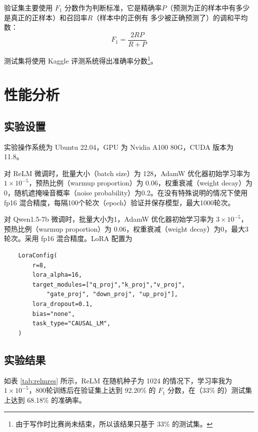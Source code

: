 \documentclass{sjtuarticle}
\begin{document}
验证集主要使用 $F_1$ 分数作为判断标准，它是精确率$P$（预测为正的样本中有多少是真正的正样本）和召回率$R$（样本中的正例有
多少被正确预测了）的调和平均数：
\begin{equation}
    F_1=\frac{2RP}{R+P}
\end{equation}

测试集将使用 Kaggle 评测系统\cite{kaggle}得出准确率分数\footnote{由于写作时比赛尚未结束，所以该结果只基于 33\% 的测试集。}。

\section{性能分析}

\subsection{实验设置}

实验操作系统为 Ubuntu 22.04，GPU 为 Nvidia A100 80G，CUDA 版本为 11.8。

对 ReLM 微调时，批量大小（batch size）为 128，AdamW 优化器初始学习率为 $1\times 10^{-5}$，预热比例（warmup proportion）为 0.06，权重衰减（weight decay）为0，随机遮掩噪音概率（noise probability）为0.2。在没有特殊说明的情况下使用 fp16 混合精度，每隔100个轮次（epoch）验证并保存模型，最大1000轮次。

对 Qwen1.5-7b 微调时，批量大小为1，AdamW 优化器初始学习率为 $3\times 10^{-5}$，预热比例（warmup proportion）为 0.06，权重衰减（weight decay）为0，最大3轮次。采用 fp16 混合精度。LoRA 配置\cite{qwensft}为 \begin{verbatim}
    LoraConfig(
        r=8,
        lora_alpha=16,
        target_modules=["q_proj","k_proj","v_proj",
            "gate_proj", "down_proj", "up_proj"],
        lora_dropout=0.1,
        bias="none",
        task_type="CAUSAL_LM",
    )
\end{verbatim}

\subsection{实验结果}

如表 \ref{tab:relmres} 所示，ReLM 在随机种子为 1024 的情况下，学习率我为$1\times 10^{-5}$，800轮训练后在验证集上达到 92.20\% 的 $F_1$ 分数，在（33\% 的）测试集上达到 68.18\% 的准确率。
\end{document}
